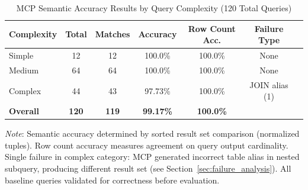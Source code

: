 \begin{table}[h]
\centering
\caption{MCP Semantic Accuracy Results by Query Complexity (120 Total Queries)}
\label{tab:accuracy_results}
\small
\begin{tabular}{lcccccc}
\toprule
\textbf{Complexity} & \textbf{Total} & \textbf{Matches} & \textbf{Accuracy} & \textbf{Row Count Acc.} & \textbf{Failure Type} \\
\midrule
Simple & 12 & 12 & 100.0\% & 100.0\% & None \\
Medium & 64 & 64 & 100.0\% & 100.0\% & None \\
Complex & 44 & 43 & 97.73\% & 100.0\% & JOIN alias (1) \\
\midrule
\textbf{Overall} & \textbf{120} & \textbf{119} & \textbf{99.17\%} & \textbf{100.0\%} & \\
\bottomrule
\end{tabular}

\footnotesize
\textit{Note}: Semantic accuracy determined by sorted result set comparison (normalized tuples). Row count accuracy measures agreement on query output cardinality. Single failure in complex category: MCP generated incorrect table alias in nested subquery, producing different result set (see Section~\ref{sec:failure_analysis}). All baseline queries validated for correctness before evaluation.
\end{table}
